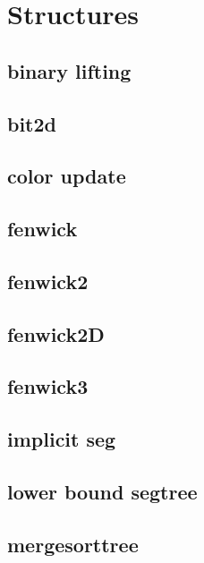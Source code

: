 \section{Structures}
\subsection{binary lifting}
\raggedbottom
\hrulefill
\subsection{bit2d}
\raggedbottom
\hrulefill
\subsection{color update}
\raggedbottom
\hrulefill
\subsection{fenwick}
\raggedbottom
\hrulefill
\subsection{fenwick2}
\raggedbottom
\hrulefill
\subsection{fenwick2D}
\raggedbottom
\hrulefill
\subsection{fenwick3}
\raggedbottom
\hrulefill
\subsection{implicit seg}
\raggedbottom
\hrulefill
\subsection{lower bound segtree}
\raggedbottom
\hrulefill
\subsection{mergesorttree}
\raggedbottom
\hrulefill
